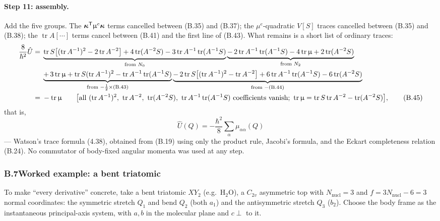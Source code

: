 \paragraph{Step 11: assembly.}
Add the five groups. The $\boldsymbol\kappa^{\mathsf T}\upmu^{e}\boldsymbol\kappa$ terms cancelled between (B.35) and (B.37); the $\mu^{e}$-quadratic $V[S]$ traces cancelled between (B.35) and (B.38); the $\operatorname{tr}A[\cdots]$ terms cancel between (B.41) and the first line of (B.43). What remains is a short list of ordinary traces:
\begin{align}
\frac{8}{\hbar^{2}}\hat U
=\;&\underbrace{\operatorname{tr}S\bigl[(\operatorname{tr}A^{-1})^{2}-2\operatorname{tr}A^{-2}\bigr]+4\operatorname{tr}(A^{-2}S)-3\operatorname{tr}A^{-1}\operatorname{tr}(A^{-1}S)}_{\text{from }N_0}
\underbrace{-\,2\operatorname{tr}A^{-1}\operatorname{tr}(A^{-1}S)-4\operatorname{tr}\Mmu+2\operatorname{tr}(A^{-2}S)}_{\text{from }N_2}\nonumber\\
&\underbrace{+\,3\operatorname{tr}\Mmu+\operatorname{tr}S(\operatorname{tr}A^{-1})^{2}-\operatorname{tr}A^{-1}\operatorname{tr}(A^{-1}S)}_{\text{from }-\frac12\times\text{(B.43)}}
\underbrace{-\,2\operatorname{tr}S\bigl[(\operatorname{tr}A^{-1})^{2}-\operatorname{tr}A^{-2}\bigr]+6\operatorname{tr}A^{-1}\operatorname{tr}(A^{-1}S)-6\operatorname{tr}(A^{-2}S)}_{\text{from }-\text{(B.44)}}\nonumber\\
=\;&-\operatorname{tr}\Mmu\qquad
\bigl[\text{all }(\operatorname{tr}A^{-1})^{2},\ \operatorname{tr}A^{-2},\ \operatorname{tr}(A^{-2}S),\ \operatorname{tr}A^{-1}\operatorname{tr}(A^{-1}S)\text{ coefficients vanish};\ \operatorname{tr}\Mmu=\operatorname{tr}S\operatorname{tr}A^{-2}-\operatorname{tr}(A^{-2}S)\bigr], \tag{B.45}
\end{align}
that is,
\begin{equation}
\boxed{\;\hat U(Q)=-\frac{\hbar^{2}}{8}\sum_{\alpha}\mu_{\alpha\alpha}(Q)\;}\tag{B.46}
\end{equation}
--- Watson's trace formula (4.38), obtained from (B.19) using only the product rule, Jacobi's formula, and the Eckart completeness relation (B.24). No commutator of body-fixed angular momenta was used at any step.

\subsubsection*{B.7\quad Worked example: a bent triatomic}

To make ``every derivative'' concrete, take a bent triatomic $XY_2$ (e.g.\ H${}_2$O), a $C_{2v}$ asymmetric top with $N_{\mathrm{nucl}}=3$ and $f=3N_{\mathrm{nucl}}-6=3$ normal coordinates: the symmetric stretch $Q_1$ and bend $Q_2$ (both $a_1$) and the antisymmetric stretch $Q_3$ ($b_2$). Choose the body frame as the instantaneous principal-axis system, with $a,b$ in the molecular plane and $c\perp$ to it.


